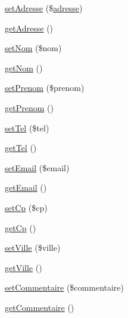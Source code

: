 \begin{DoxyCompactItemize}
\item 
\hyperlink{class_acme_group_1_1_labo_bundle_1_1_entity_1_1facture_a932e14fb0b2d37f2f30c56fda4efa371}{set\+Adresse} (\$\hyperlink{class_acme_group_1_1_labo_bundle_1_1_entity_1_1adresse}{adresse})
\item 
\hyperlink{class_acme_group_1_1_labo_bundle_1_1_entity_1_1facture_a8fce2a01d450218b17106abe8d4cf327}{get\+Adresse} ()
\item 
\hyperlink{class_acme_group_1_1_labo_bundle_1_1_entity_1_1facture_a7386958e19f9cf42eee4eb76772a157f}{set\+Nom} (\$nom)
\item 
\hyperlink{class_acme_group_1_1_labo_bundle_1_1_entity_1_1facture_a2f6fa7d4c59ea0fb9c4ebcce3b30da43}{get\+Nom} ()
\item 
\hyperlink{class_acme_group_1_1_labo_bundle_1_1_entity_1_1facture_a8a19937a79b458da440ca38d88428f64}{set\+Prenom} (\$prenom)
\item 
\hyperlink{class_acme_group_1_1_labo_bundle_1_1_entity_1_1facture_a59463550a9b82c2fcb224249e0ffee41}{get\+Prenom} ()
\item 
\hyperlink{class_acme_group_1_1_labo_bundle_1_1_entity_1_1facture_a79dfda29fc3038cd08b4255534aa06ec}{set\+Tel} (\$tel)
\item 
\hyperlink{class_acme_group_1_1_labo_bundle_1_1_entity_1_1facture_aefdf17c57778301eb152f003067a8277}{get\+Tel} ()
\item 
\hyperlink{class_acme_group_1_1_labo_bundle_1_1_entity_1_1facture_ab2dd10f17a8010e68db791ae635e3233}{set\+Email} (\$email)
\item 
\hyperlink{class_acme_group_1_1_labo_bundle_1_1_entity_1_1facture_a46fe4943401b6a7390cd00838cbb9180}{get\+Email} ()
\item 
\hyperlink{class_acme_group_1_1_labo_bundle_1_1_entity_1_1facture_af9f30a01d191b2bf33461366b935fdca}{set\+Cp} (\$cp)
\item 
\hyperlink{class_acme_group_1_1_labo_bundle_1_1_entity_1_1facture_a7e7e03da19979c18e32bf2fb253030e6}{get\+Cp} ()
\item 
\hyperlink{class_acme_group_1_1_labo_bundle_1_1_entity_1_1facture_ad4f7d8be5e8873bfa8302a355f6e2ee0}{set\+Ville} (\$ville)
\item 
\hyperlink{class_acme_group_1_1_labo_bundle_1_1_entity_1_1facture_a90a197332be53037a2b6627ef830cc9c}{get\+Ville} ()
\item 
\hyperlink{class_acme_group_1_1_labo_bundle_1_1_entity_1_1facture_ab55e860020e2194c80affc9526d21aa2}{set\+Commentaire} (\$commentaire)
\item 
\hyperlink{class_acme_group_1_1_labo_bundle_1_1_entity_1_1facture_a2f71242eead00552d5074f25d8486c06}{get\+Commentaire} ()
\end{DoxyCompactItemize}


